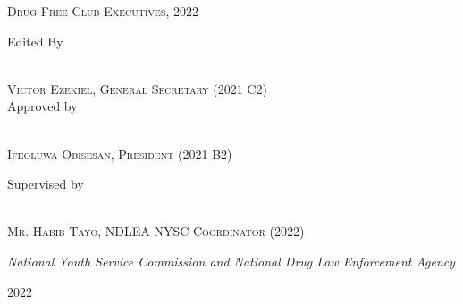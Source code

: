 \documentclass{report}
\begin{document}
\begin{titlepage}
	\vspace{0.5\baselineskip} %
	
	{\scshape\Large  Drug Free Club Executives, 2022\\} %
	\vspace*{3\baselineskip}
	
	Edited By
	
	\vspace{0.5\baselineskip} %
	\vspace*{3\baselineskip}
	\\
	{\scshape\Large Victor Ezekiel, General Secretary (2021 C2) \\} %
	\vspace*{3\baselineskip}
	Approved by
	
	\vspace{0.5\baselineskip} %
	\vspace*{3\baselineskip}
	\\
	{\scshape\Large  Ifeoluwa Obisesan, President (2021 B2)\\} %
	
	\vspace*{3\baselineskip}
	
	Supervised by
	
	\vspace{0.5\baselineskip} %
	\vspace*{3\baselineskip}
	\\
	{\scshape\Large  Mr. Habib Tayo, NDLEA NYSC Coordinator (2022)\\} %
	
	\vspace{0.5\baselineskip} %
	
	\textit{National Youth Service Commission and National Drug Law Enforcement Agency} %
	
	\vfill %
	
	
	\plogo %
	
	\vspace{0.3\baselineskip} %
	
	2022 %
	
	{\large } %

\end{titlepage}
\end{document}
